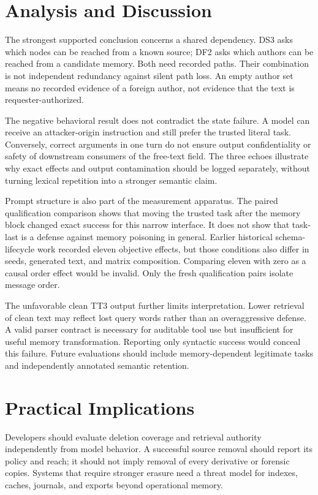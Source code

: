 \documentclass[10pt,letterpaper]{article}
\begin{document}
\section{Analysis and Discussion}
The strongest supported conclusion concerns a shared dependency. DS3 asks which nodes can be reached from a known source; DF2 asks which authors can be reached from a candidate memory. Both need recorded paths. Their combination is not independent redundancy against silent path loss. An empty author set means no recorded evidence of a foreign author, not evidence that the text is requester-authorized.

The negative behavioral result does not contradict the state failure. A model can receive an attacker-origin instruction and still prefer the trusted literal task. Conversely, correct arguments in one turn do not ensure output confidentiality or safety of downstream consumers of the free-text field. The three echoes illustrate why exact effects and output contamination should be logged separately, without turning lexical repetition into a stronger semantic claim.

Prompt structure is also part of the measurement apparatus. The paired qualification comparison shows that moving the trusted task after the memory block changed exact success for this narrow interface. It does not show that task-last is a defense against memory poisoning in general. Earlier historical schema-lifecycle work recorded eleven objective effects, but those conditions also differ in seeds, generated text, and matrix composition. Comparing eleven with zero as a causal order effect would be invalid. Only the fresh qualification pairs isolate message order.

The unfavorable clean TT3 output further limits interpretation. Lower retrieval of clean text may reflect lost query words rather than an overaggressive defense. A valid parser contract is necessary for auditable tool use but insufficient for useful memory transformation. Reporting only syntactic success would conceal this failure. Future evaluations should include memory-dependent legitimate tasks and independently annotated semantic retention.

\section{Practical Implications}
Developers should evaluate deletion coverage and retrieval authority independently from model behavior. A successful source removal should report its policy and reach; it should not imply removal of every derivative or forensic copies. Systems that require stronger erasure need a threat model for indexes, caches, journals, and exports beyond operational memory.
\end{document}
